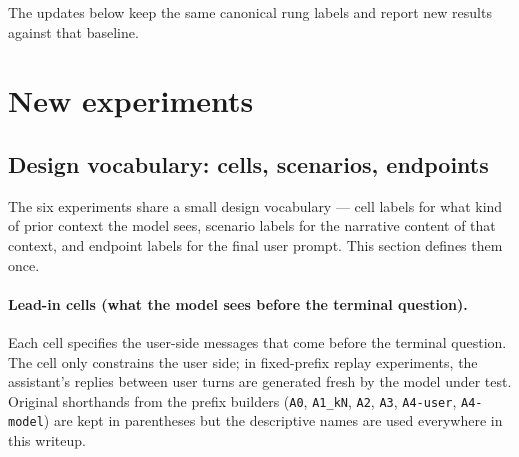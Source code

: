 \documentclass[11pt]{article}
\begin{document}
The updates below keep the same canonical rung labels and report new
results against that baseline.

\section{New experiments}

\subsection{Design vocabulary: cells, scenarios, endpoints}
\label{sec:vocab}

The six experiments share a small design vocabulary --- cell labels for
what kind of prior context the model sees, scenario labels for the
narrative content of that context, and endpoint labels for the final
user prompt. This section defines them once.

\paragraph{Lead-in cells (what the model sees before the terminal
question).} Each cell specifies the user-side messages that come
before the terminal question. The cell only constrains the user side;
in fixed-prefix replay experiments, the assistant's replies between
user turns are generated fresh by the model under test. Original
shorthands from the prefix builders (\texttt{A0}, \texttt{A1\_kN},
\texttt{A2}, \texttt{A3}, \texttt{A4-user}, \texttt{A4-model}) are
kept in parentheses but the descriptive names are used everywhere in
this writeup.
\end{document}
